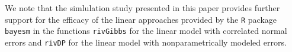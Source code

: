 We note that the simlulation study presented in this paper provides further support for the
efficacy of the linear approaches provided by the \texttt{R} package
\texttt{bayesm} \citep{RPbayesm} in the functions
\texttt{rivGibbs} for the linear model with correlated normal errors and \texttt{rivDP} for the linear model
with nonparametrically modeled errors.



